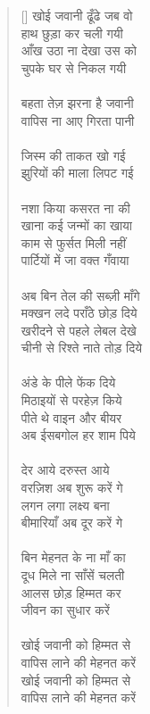 \begin{verse}[\versewidth]\texthindi{
खोई जवानी ढूँढे जब वो\\
हाथ छुड़ा कर चली गयी\\
आँख उठा ना देखा उस को\\
चुपके घर से निकल गयी\\
\\
बहता तेज़ झरना है जवानी\\
वापिस ना आए गिरता पानी\\
\\
जिस्म की ताकत खो गई\\
झुरियों की माला लिपट गई\\
\\
नशा किया कसरत ना की\\
खाना कई जन्मों का खाया\\
काम से फुर्सत मिली नहीं\\
पार्टियों में जा वक्त गँवाया\\
\\
अब बिन तेल की सब्ज़ी माँगे\\
मक्खन लदे पराँठे छोड़ दिये\\
खरीदने से पहले लेबल देखे\\
चीनी से रिश्ते नाते तोड़ दिये\\
\\
अंडे के पीले फेंक दिये\\
मिठाइयों से परहेज़ किये\\
पीते थे वाइन और बीयर\\
अब ईसबगोल हर शाम पिये\\
\\
देर आये दरुस्त आये\\
वरज़िश अब शुरू करें गे\\
लगन लगा लक्ष्य बना\\
बीमारियाँ अब दूर करें गे\\
\\
बिन मेहनत के ना माँ का\\
दूध मिले ना साँसें चलती\\
आलस छोड़ हिम्मत कर\\
जीवन का सुधार करें\\
\\
खोई जवानी को हिम्मत से\\
वापिस लाने की मेहनत करें\\
खोई जवानी को हिम्मत से\\
वापिस लाने की मेहनत करें
}\end{verse}

